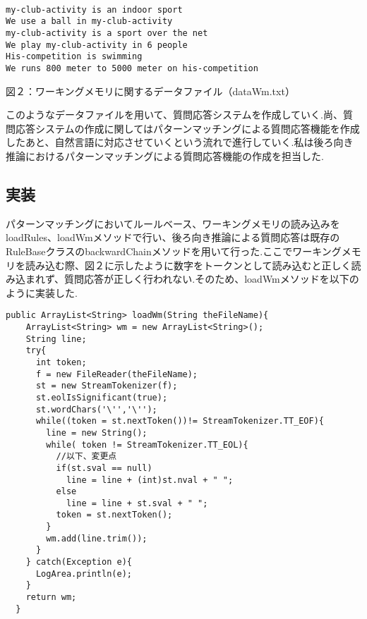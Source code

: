 \documentclass[a4j]{jarticle}
\begin{document}
\begin{screen}
\begin{verbatim}

my-club-activity is an indoor sport
We use a ball in my-club-activity
my-club-activity is a sport over the net
We play my-club-activity in 6 people
His-competition is swimming
We runs 800 meter to 5000 meter on his-competition

\end{verbatim}
\end{screen}
\begin{center}
図２：ワーキングメモリに関するデータファイル（dataWm.txt）\\
\end{center}
このようなデータファイルを用いて、質問応答システムを作成していく.尚、質問応答システムの作成に関してはパターンマッチングによる質問応答機能を作成したあと、自然言語に対応させていくという流れで進行していく.私は後ろ向き推論におけるパターンマッチングによる質問応答機能の作成を担当した.

\subsection{実装}
パターンマッチングにおいてルールベース、ワーキングメモリの読み込みをloadRules、loadWmメソッドで行い、後ろ向き推論による質問応答は既存のRuleBaseクラスのbackwardChainメソッドを用いて行った.ここでワーキングメモリを読み込む際、図２に示したように数字をトークンとして読み込むと正しく読み込まれず、質問応答が正しく行われない.そのため、loadWmメソッドを以下のように実装した.\\

\begin{lstlisting}[caption=loadWmメソッド]
  public ArrayList<String> loadWm(String theFileName){
    ArrayList<String> wm = new ArrayList<String>();
    String line;
    try{
      int token;
      f = new FileReader(theFileName);
      st = new StreamTokenizer(f);
      st.eolIsSignificant(true);
      st.wordChars('\'','\'');
      while((token = st.nextToken())!= StreamTokenizer.TT_EOF){
        line = new String();
        while( token != StreamTokenizer.TT_EOL){
          //以下、変更点
          if(st.sval == null)
            line = line + (int)st.nval + " ";
          else
            line = line + st.sval + " ";
          token = st.nextToken();
        }
        wm.add(line.trim());
      }
    } catch(Exception e){
      LogArea.println(e);
    }
    return wm;
  }

\end{lstlisting}
\end{document}
